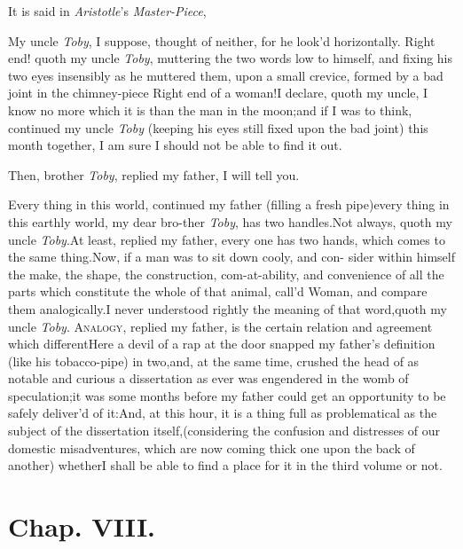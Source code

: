 \documentclass{article}
\begin{document}
It is said in \textit{Aristotle}’s \textit{Master-Piece},

My uncle \textit{Toby}, I suppose, thought of neither, for he
look’d horizontally.\tsk\break
Right end! quoth my uncle \textit{Toby}, muttering the two words low to himself, and fixing his
two eyes insensibly as he muttered them, upon a small crevice,
formed by a bad joint in the chimney-piece\tsk\break
Right end of a woman!\tsh I declare,\pb
quoth my uncle, I know no more
which it is than the man in the moon;\tsh and if I was to
think, continued my uncle \textit{Toby} (keeping his eyes still fixed
upon the bad joint) this month together, I am sure I should not be able to find it out.

Then, brother \textit{Toby}, replied my father, I will tell you.

Every thing in this world, continued my father (filling a fresh
pipe)\tsk every thing in this earthly world, my dear
bro-\break ther \textit{Toby},
has two handles.\tsk Not always, quoth my uncle
\textit{Toby}.\tsh At least, replied my father, every one
has two hands,\tsk\break
which comes to the same
thing.\tsh Now, if a man was to sit down cooly, and con-\break
sider within himself the make, the shape, the construction,
com-at-ability, and convenience of all the parts which
constitute\pb
the whole of that animal, call’d Woman, and compare them
analogically.\tsk I never understood rightly the meaning of that
word,\tsk quoth my uncle \textit{Toby}.\tsh\break
\textsc{Analogy}, replied my father, is the certain
relation and agreement which different\tsh Here a devil of
a rap at the door snapped my father’s definition (like his
tobacco-pipe) in two,\tsk and, at the same time, crushed the head
of as notable and curious a dissertation as ever was
engendered in the womb of speculation;\tsk it was some months
before my father could get an opportunity to be safely
deliver’d of
it:\tsk And, at this hour, it is a thing full as problematical as
the subject of the dissertation itself,\tsk (considering the
confusion and distresses of our domestic misadventures, which are
now coming thick one upon the back of another) whether\pb I shall be
able to find a place for it in the third volume or not.

\section{Chap. VIII.}
\end{document}
